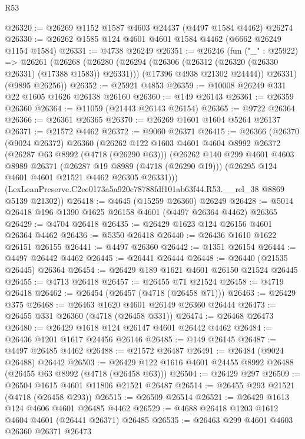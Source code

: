 \begin{lexlean}{R53}
\begin{coremodule}
@26320 := @26269 @1152 @1587 @4603 @24437 (@4497 @1584 @4462) @26274
@26330 := @26262 @1585 @124 @4601 @4601 @1584 @4462 (@6662 @26249 @1154 @1584)
@26331 := @4738 @26249
@26351 := @26246
    (fun ("_" : @25922) =>
    @26261
      (@26268
        (@26280
          (@26294 (@26306 (@26312 (@26320 (@26330 @26331) (@17388 @1583)) @26331)))
          (@17396 @4938 @21302 @24444))
        @26331)
      (@9895 @26256))
@26352 := @25921 @4853
@26359 := @10008 @26249 @331 @22 @1605 @1626 @26138 @26160
@26360 := @149 @26143
@26361 := @26359 @26360
@26364 := @11059 (@21443 @26143 @26154)
@26365 := @9722 @26364
@26366 := @26361 @26365
@26370 := @26269 @1601 @1604 @5264 @26137
@26371 := @21572 @4462
@26372 := @9060 @26371
@26415 := @26366
    (@26370
      (@9024 @26372)
      @26360
      (@26262
        @122
        @1603
        @4601
        @4604
        @8992
        @26372
        (@26287 @63 @8992 (@4718 (@26290 @63)))
        (@26262
          @140
          @299
          @4601
          @4603
          @8989
          @26371
          (@26287 @19 @8989 (@4718 (@26290 @19)))
          (@26295 @124 @4601 @4601 @21521 @4462 @26305 @26331)))
      (LexLeanPreserve.C2ee0173a5a920c78788fdf101ab63f44.R53.__rel_38 @8869 @5139 @21302))
@26418 := @4645 (@15259 @26360) @26249
@26428 := @5014 @26418 @196 @1390 @1625 @26158 @4601 (@4497 @26364 @4462) @26365
@26429 := @4704 @26418
@26435 := @26429 @1623 @124 @26156 @4601 @26364 @4462
@26436 := @5350 @26418
@26440 := @26436 @1610 @1622 @26151 @26155
@26441 := @4497 @26360
@26442 := @1351 @26154
@26444 := @4497 @26442 @4462
@26445 := @26441 @26444
@26448 := @26440 (@21535 @26445) @26364
@26454 := @26429 @189 @1621 @4601 @26150 @21524 @26445
@26455 := @4713 @26418
@26457 := @26455 @71 @21524
@26458 := @4719 @26418
@26462 := @26454 (@26457 (@4718 (@26458 @71)))
@26463 := @26429 @375
@26468 := @26463 @1620 @4601 @26149 @26360 @26444
@26473 := @26455 @331 @26360 (@4718 (@26458 @331))
@26474 := @26468 @26473
@26480 := @26429 @1618 @124 @26147 @4601 @26442 @4462
@26484 := @26436 @1201 @1617 @24456 @26146
@26485 := @149 @26145
@26487 := @4497 @26485 @4462
@26488 := @21572 @26487
@26491 := @26484 (@9024 @26488) @26442
@26503 := @26429 @122 @1616 @4601 @24455 @8992 @26488 (@26455 @63 @8992 (@4718 (@26458 @63)))
@26504 := @26429 @297
@26509 := @26504 @1615 @4601 @11806 @21521 @26487
@26514 := @26455 @293 @21521 (@4718 (@26458 @293))
@26515 := @26509 @26514
@26521 := @26429 @1613 @124 @4606 @4601 @26485 @4462
@26529 := @4688 @26418 @1203 @1612 @4604 @4601 (@26441 @26371) @26485
@26535 := @26463 @299 @4601 @4603 @26360 @26371 @26473

\end{coremodule}
\end{lexlean}
